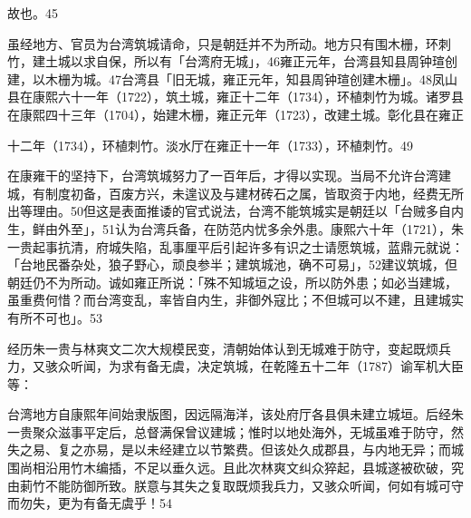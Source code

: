 故也。45

虽经地方、官员为台湾筑城请命，只是朝廷并不为所动。地方只有围木栅，环刺竹，建土城以求自保，所以有「台湾府无城」，46雍正元年，台湾县知县周钟瑄创建，以木栅为城。47台湾县「旧无城，雍正元年，知县周钟瑄创建木栅」。48凤山县在康熙六十一年（1722），筑土城，雍正十二年（1734），环植刺竹为城。诸罗县在康熙四十三年（1704），始建木栅，雍正元年（1723），改建土城。彰化县在雍正

\vfill
\begin{BookNotes}
\end{BookNotes}

\noindent 十二年（1734），环植刺竹。淡水厅在雍正十一年（1733），环植刺竹。49

在康雍干的坚持下，台湾筑城努力了一百年后，才得以实现。当局不允许台湾建城，有制度初备，百废方兴，未遑议及与建材砖石之属，皆取资于内地，经费无所出等理由。50但这是表面推诿的官式说法，台湾不能筑城实是朝廷以「台贼多自内生，鲜由外至」，51认为台湾兵备，在防范内忧多余外患。康熙六十年（1721），朱一贵起事抗清，府城失陷，乱事厘平后引起许多有识之士请愿筑城，蓝鼎元就说：「台地民番杂处，狼子野心，顽良参半；建筑城池，确不可易」，52建议筑城，但朝廷仍不为所动。诚如雍正所说：「殊不知城垣之设，所以防外患；如必当建城，虽重费何惜？而台湾变乱，率皆自内生，非御外寇比；不但城可以不建，且建城实有所不可也」。53

经历朱一贵与林爽文二次大规模民变，清朝始体认到无城难于防守，变起既烦兵力，又骇众听闻，为求有备无虞，决定筑城，在乾隆五十二年（1787）谕军机大臣等：

\begin{BookQuote}
台湾地方自康熙年间始隶版图，因远隔海洋，该处府厅各县俱未建立城垣。后经朱一贵聚众滋事平定后，总督满保曾议建城；惟时以地处海外，无城虽难于防守，然失之易、复之亦易，是以未经建立以节繁费。但该处久成郡县，与内地无异；而城围尚相沿用竹木编插，不足以垂久远。且此次林爽文纠众猝起，县城遂被砍破，究由莿竹不能防御所致。朕意与其失之复取既烦我兵力，又骇众听闻，何如有城可守而勿失，更为有备无虞乎！54
\end{BookQuote}

